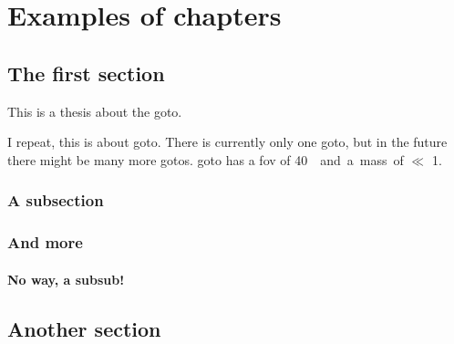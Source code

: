 \chapter{Examples of chapters}
\label{chap:examples}
\chaptoc{}
\newpage

\section{The first section}
\label{sec:section1}

This is a thesis about the \gls{goto}.

I repeat, this is about \gls{goto}. There is currently only one \gls{goto}, but in the future there might be many more \gls{goto}s. \gls{goto} has a \gls{fov} of \about\SI{40}{\square\deg} and a mass of $\ll$ \SI{1}{\solarmass}.

\lipsum[1-2] %

\subsection{A subsection}

\lipsum[3-6] %

\subsection{And more}

\lipsum[7-9] %

\subsubsection{No way, a subsub!}

\lipsum[10-12] %


\section{Another section}
\label{sec:section2}

\lipsum[13-19] %
